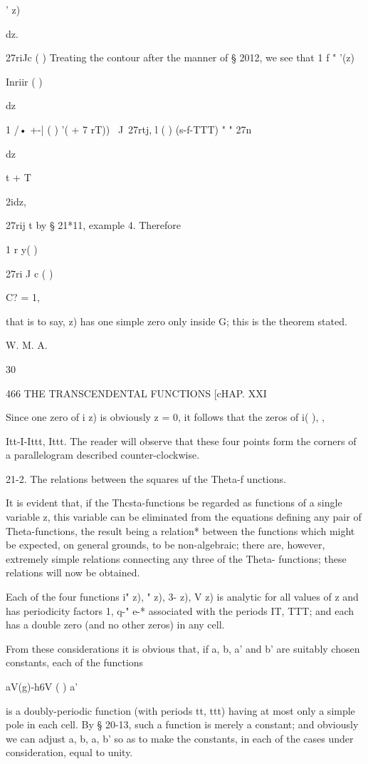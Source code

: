  ' z)

dz.

27riJc ( ) Treating the contour after the manner of § 2012, we see
that 1 f " '(z)

Inriir ( )

dz

1 /• +-| ( ) '( + 7 rT)) \ J\ 27rtj, l ( ) (s-f-TTT) " " 27n

dz

t + T

2idz,

27rij t by § 21*11, example 4. Therefore

1 r y( )

27ri J c ( )

C? = 1,

that is to say, z) has one simple zero only inside G; this is the
theorem stated.

W. M. A.

30

466 THE TRANSCENDENTAL FUNCTIONS [cHAP. XXI

Since one zero of i z) is obviously z = 0, it follows that the zeros
of i( ), %
,

Itt-I-Ittt, Ittt. The reader will observe that these four points form
the corners of a parallelogram described counter-clockwise.

21-2. The relations between the squares uf the Theta-f unctions.

It is evident that, if the Thcsta-functions be regarded as functions
of a single variable z, this variable can be eliminated from the
equations defining any pair of Theta-functions, the result being a
relation* between the functions which might be expected, on general
grounds, to be non-algebraic; there are, however, extremely simple
relations connecting any three of the Theta- functions; these
relations will now be obtained.

Each of the four functions i" z), " z), 3- z), V z) is analytic for
all values of z and has periodicity factors 1, q-" e-* associated with
the periods IT, TTT; and each has a double zero (and no other zeros)
in any cell.

From these considerations it is obvious that, if a, b, a' and b' are
suitably chosen constants, each of the functions

aV(g)-h6V ( ) a'%

is a doubly-periodic function (with periods tt, ttt) having at most
only a simple pole in each cell. By § 20-13, such a function is merely
a constant; and obviously we can adjust a, b, a, b' so as to make the
constants, in each of the cases under consideration, equal to unity.

